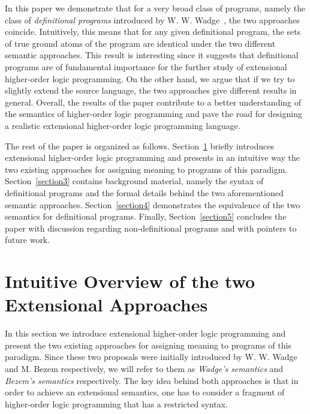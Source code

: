 \documentclass[submission,copyright]{eptcs}
\theoremstyle{definition}
\begin{document}
In this paper we demonstrate that for a very broad class of programs, namely
the class of {\em definitional programs} introduced by W. W. Wadge~\cite{Wa91a},
the two approaches coincide. Intuitively, this means that for any given definitional
program, the sets of true ground atoms of the program are identical under the two
different semantic approaches. This result is interesting since it suggests that
definitional programs are of fundamental importance for the further study of extensional
higher-order logic programming. On the other hand, we argue that if we try to slightly
extend the source language, 
the two approaches give different
results in general. Overall, the results of the paper contribute to a better
understanding of the semantics of higher-order logic programming and pave the
road for designing a realistic extensional higher-order logic programming language.

The rest of the paper is organized as follows. Section~\ref{section2} briefly introduces
extensional higher-order logic programming and presents in an intuitive way the two existing
approaches for assigning meaning to programs of this paradigm. Section~\ref{section3} contains 
background material, namely the syntax of definitional programs and the formal details behind the
two aforementioned semantic approaches. Section~\ref{section4} demonstrates the
equivalence of the two semantics for definitional programs. Finally, Section~\ref{section5}
concludes the paper with discussion regarding non-definitional programs and
with pointers to future work.


\section{Intuitive Overview of the two Extensional Approaches}\label{section2}
In this section we introduce extensional higher-order logic programming and 
present the two existing approaches for assigning meaning to programs of this paradigm. 
Since these two proposals were initially introduced by W. W. Wadge and M. Bezem
respectively, we will refer to them as {\em Wadge's semantics} and {\em Bezem's semantics}
respectively. The key idea behind both approaches is that in order to achieve
an extensional semantics, one has to consider a fragment of higher-order logic
programming that has a restricted syntax.
\end{document}
